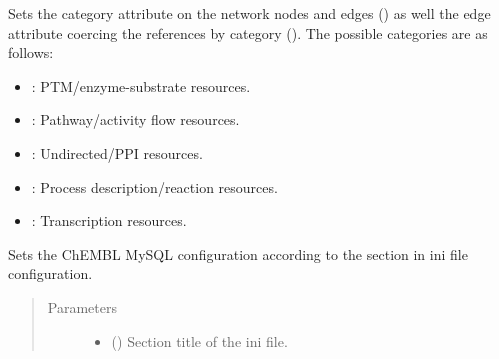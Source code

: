 \documentclass[letterpaper,10pt,english]{sphinxmanual}
\begin{document}
\begin{fulllineitems}

\begin{fulllineitems}
\label{\detokenize{main:pypath.main.PyPath.set_boolean_vattr}}
\end{fulllineitems}


\begin{fulllineitems}
\label{\detokenize{main:pypath.main.PyPath.set_categories}}
Sets the category attribute on the network nodes and edges
() as well the edge attribute coercing the references
by category (). The possible categories are
as follows:
\begin{itemize}
\item {} 
: PTM/enzyme-substrate resources.

\item {} 
: Pathway/activity flow resources.

\item {} 
: Undirected/PPI resources.

\item {} 
: Process description/reaction resources.

\item {} 
: Transcription resources.

\end{itemize}

\end{fulllineitems}


\begin{fulllineitems}
\label{\detokenize{main:pypath.main.PyPath.set_chembl_mysql}}
Sets the ChEMBL MySQL configuration according to the 
section in  ini file configuration.
\begin{quote}\begin{description}
\item[{Parameters}] \leavevmode\begin{itemize}
\item {} 
 () \textendash{} Section title of the ini file.


\end{itemize}
\end{description}
\end{quote}
\end{fulllineitems}
\end{fulllineitems}
\end{document}
